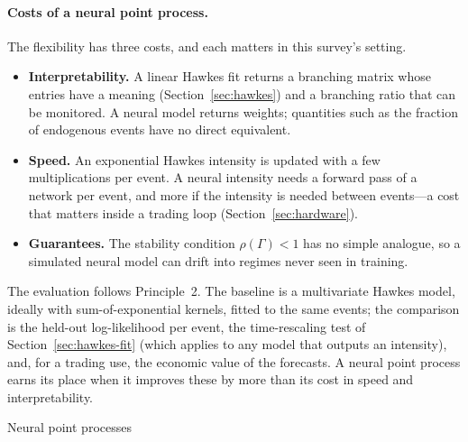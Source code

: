 \paragraph{Costs of a neural point process.} The flexibility has three costs, and each matters in this survey's setting.
\begin{itemize}[leftmargin=1.5em,itemsep=2pt]
\item \textbf{Interpretability.} A linear Hawkes fit returns a branching matrix whose entries have a
  meaning (Section~\ref{sec:hawkes}) and a branching ratio that can be monitored. A neural model returns
  weights; quantities such as the fraction of endogenous events have no direct equivalent.
\item \textbf{Speed.} An exponential Hawkes intensity is updated with a few multiplications per event.
  A neural intensity needs a forward pass of a network per event, and more if the intensity is needed
  between events---a cost that matters inside a trading loop (Section~\ref{sec:hardware}).
\item \textbf{Guarantees.} The stability condition $\rho(\Gamma) < 1$ has no simple analogue, so a
  simulated neural model can drift into regimes never seen in training.
\end{itemize}
The evaluation follows Principle~2. The baseline is a multivariate Hawkes model, ideally with
sum-of-exponential kernels, fitted to the same events; the comparison is the held-out log-likelihood per
event, the time-rescaling test of Section~\ref{sec:hawkes-fit} (which applies to any model that outputs
an intensity), and, for a trading use, the economic value of the forecasts. A neural point process
earns its place when it improves these by more than its cost in speed and interpretability.

\begin{modelcard}{Neural point processes}
\end{modelcard}

